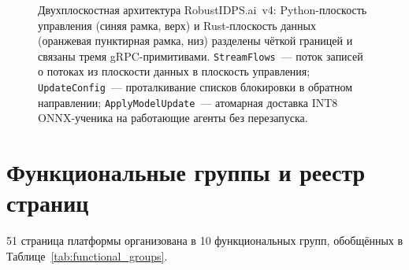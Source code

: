 \begin{figure}[htbp]
\caption{Двухплоскостная архитектура \textsf{RobustIDPS.ai}~v4:
Python-плоскость управления (синяя рамка, верх) и Rust-плоскость
данных (оранжевая пунктирная рамка, низ) разделены чёткой границей и
связаны тремя gRPC-примитивами. \texttt{StreamFlows}~--- поток
записей о потоках из плоскости данных в плоскость управления;
\texttt{UpdateConfig}~--- проталкивание списков блокировки в
обратном направлении; \texttt{ApplyModelUpdate}~--- атомарная
доставка INT8 ONNX-ученика на работающие агенты без перезапуска.}
\label{fig:two_plane_arch}
\end{figure}


\section{Функциональные группы и реестр страниц}
\label{sec:functional_groups}

51 страница платформы организована в 10 функциональных групп, обобщённых в Таблице~\ref{tab:functional_groups}.

